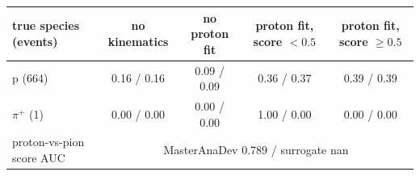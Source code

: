 \begin{tabular}{lcccc}
\toprule
true species (events) & no kinematics & no proton fit & proton fit, score $<0.5$ & proton fit, score $\geq 0.5$ \\
\midrule
p (664) & 0.16 / 0.16 & 0.09 / 0.09 & 0.36 / 0.37 & 0.39 / 0.39 \\
$\pi^+$ (1) & 0.00 / 0.00 & 0.00 / 0.00 & 1.00 / 0.00 & 0.00 / 0.00 \\
\midrule
proton-vs-pion score AUC & \multicolumn{4}{c}{MasterAnaDev 0.789 / surrogate nan} \\
\bottomrule
\end{tabular}
